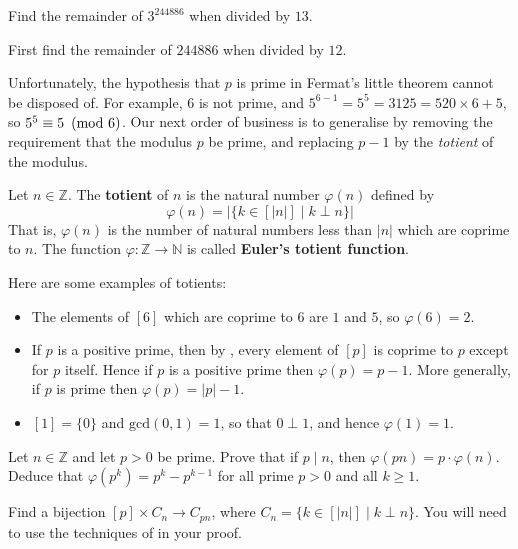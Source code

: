 \begin{exercise}
\label{RemainderOfThreeExpBigRemThirteen}
Find the remainder of $3^{244886}$ when divided by $13$.
\begin{backhint}
First find the remainder of $244886$ when divided by $12$.
\end{backhint}
\end{exercise}

Unfortunately, the hypothesis that $p$ is prime in Fermat's little theorem cannot be disposed of. For example, $6$ is not prime, and $5^{6-1} = 5^5 = 3125 = 520 \times 6 + 5$, so $5^5 \equiv 5 ~\left(\text{mod}~6\right)$. Our next order of business is to generalise  by removing the requirement that the modulus $p$ be prime, and replacing $p-1$ by the \textit{totient} of the modulus.

\begin{definition}
\label{defTotient}
Let $n \in \mathbb{Z}$. The \textbf{totient} of $n$ is the natural number $\varphi(n)$  defined by
\[ \varphi(n) = | \{ k \in [ |n| ] \mid k \perp n \}| \]
That is, $\varphi(n)$ is the number of natural numbers less than $|n|$ which are coprime to $n$. The function $\varphi : \mathbb{Z} \to \mathbb{N}$ is called \textbf{Euler's totient function}.
\end{definition}

\begin{example}
\label{exComputationsOfTotients}
Here are some examples of totients:
\begin{itemize}
\item The elements of $[6]$ which are coprime to $6$ are $1$ and $5$, so $\varphi(6)=2$.
\item If $p$ is a positive prime, then by , every element of $[p]$ is coprime to $p$ except for $p$ itself. Hence if $p$ is a positive prime then $\varphi(p)=p-1$. More generally, if $p$ is prime then $\varphi(p) = |p|-1$.
\item $[1] = \{ 0 \}$ and $\mathrm{gcd}(0,1) = 1$, so that $0 \perp 1$, and hence $\varphi(1) = 1$.
\end{itemize}
\end{example}

\begin{exercise}
\label{exTotientMultiplyByPrime}
Let $n \in \mathbb{Z}$ and let $p > 0$ be prime. Prove that if $p \mid n$, then $\varphi(pn) = p \cdot \varphi(n)$. Deduce that $\varphi(p^k) = p^k-p^{k-1}$ for all prime $p>0$ and all $k \ge 1$.
\begin{backhint}
Find a bijection $[p] \times C_n \to C_{pn}$, where $C_n = \{ k \in [|n|] \mid k \perp n \}$. You will need to use the techniques of  in your proof.
\end{backhint}
\end{exercise}

